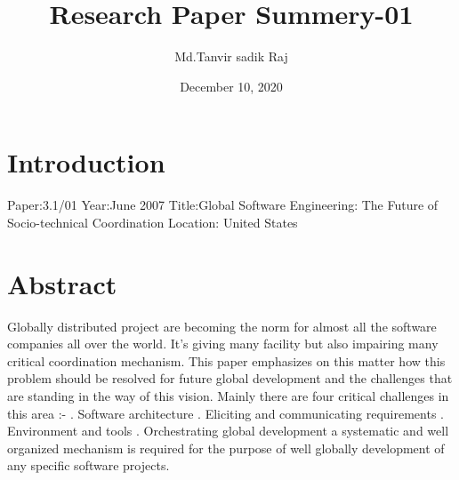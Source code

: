\documentclass{article}
\title{Research Paper Summery-01}
\author{Md.Tanvir sadik Raj}
\date{December 10, 2020}
\begin{document}
\maketitle

\section{Introduction}
Paper:3.1/01 \newline \newline
Year:June 2007 \newline \newline
Title:Global Software Engineering: The Future of Socio-technical Coordination \newline \newline
Location: United States \newline

\section{Abstract}
Globally distributed project are becoming the norm for almost all the software companies all over the world. It’s giving many facility but also impairing many critical coordination mechanism. This paper emphasizes on this matter how this problem should be resolved for future global development and the challenges that are standing in the way of this vision. Mainly there are four critical challenges in this area :- \newline {}.	Software architecture .	Eliciting and communicating requirements .	Environment and tools .	Orchestrating global development \newline \newline
a systematic and well organized mechanism is required for the purpose of well globally development of any specific software projects. \newline
\end{document}
